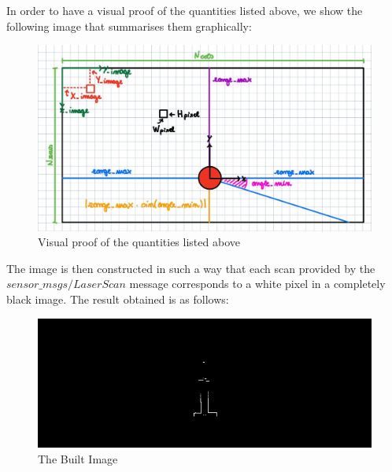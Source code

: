 In order to have a visual proof of the quantities listed above, we show the following image that summarises them graphically:
\begin{center}
    \begin{figure}[H]
        \begin{minipage}{1.0\textwidth}
            \centering
                \includegraphics[scale=0.45]{images/narrowSpace/formulas.png}
            \caption{Visual proof of the quantities listed above}
        \end{minipage}
    \end{figure}            
\end{center}
The image is then constructed in such a way that each scan provided by the \(sensor\_msgs/LaserScan\) message corresponds to a white pixel in a completely black image. The result obtained is as follows:
\begin{center}
    \begin{figure}[H]
        \begin{minipage}{1.0\textwidth}
            \centering
                \includegraphics[scale=0.70]{images/narrowSpace/initialImage.png}
            \caption{The Built Image}
        \end{minipage}
    \end{figure}            
\end{center}
